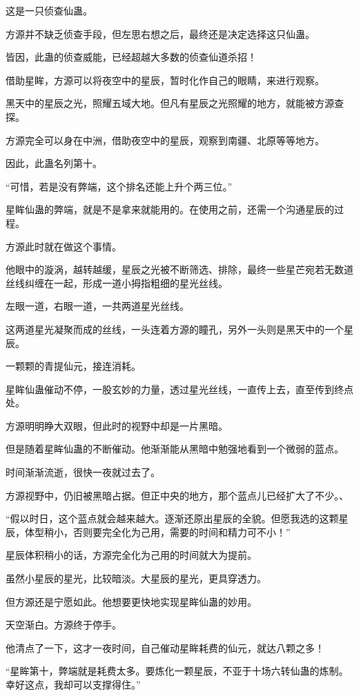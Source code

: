 \begin{this_body}
这是一只侦查仙蛊。

方源并不缺乏侦查手段，但左思右想之后，最终还是决定选择这只仙蛊。

皆因，此蛊的侦查威能，已经超越大多数的侦查仙道杀招！

借助星眸，方源可以将夜空中的星辰，暂时化作自己的眼睛，来进行观察。

黑天中的星辰之光，照耀五域大地。但凡有星辰之光照耀的地方，就能被方源查探。

方源完全可以身在中洲，借助夜空中的星辰，观察到南疆、北原等等地方。

因此，此蛊名列第十。

“可惜，若是没有弊端，这个排名还能上升个两三位。”

星眸仙蛊的弊端，就是不是拿来就能用的。在使用之前，还需一个沟通星辰的过程。

方源此时就在做这个事情。

他眼中的漩涡，越转越缓，星辰之光被不断筛选、排除，最终一些星芒宛若无数道丝线纠缠在一起，形成一道小拇指粗细的星光丝线。

左眼一道，右眼一道，一共两道星光丝线。

这两道星光凝聚而成的丝线，一头连着方源的瞳孔，另外一头则是黑天中的一个星辰。

一颗颗的青提仙元，接连消耗。

星眸仙蛊催动不停，一股玄妙的力量，透过星光丝线，一直传上去，直至传到终点处。

方源明明睁大双眼，但此时的视野中却是一片黑暗。

但是随着星眸仙蛊的不断催动。他渐渐能从黑暗中勉强地看到一个微弱的蓝点。

时间渐渐流逝，很快一夜就过去了。

方源视野中，仍旧被黑暗占据。但正中央的地方，那个蓝点儿已经扩大了不少。、

“假以时日，这个蓝点就会越来越大。逐渐还原出星辰的全貌。但愿我选的这颗星辰，体型稍小，否则要完全化为己用，需要的时间和精力可不小！”

星辰体积稍小的话，方源完全化为己用的时间就大为提前。

虽然小星辰的星光，比较暗淡。大星辰的星光，更具穿透力。

但方源还是宁愿如此。他想要更快地实现星眸仙蛊的妙用。

天空渐白。方源终于停手。

他清点了一下，这才一夜时间，自己催动星眸耗费的仙元，就达八颗之多！

“星眸第十，弊端就是耗费太多。要炼化一颗星辰，不亚于十场六转仙蛊的炼制。幸好这点，我却可以支撑得住。”


\end{this_body}
